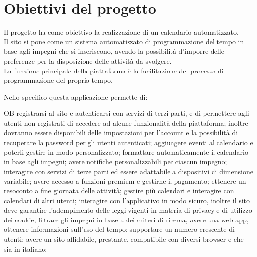 \section{Obiettivi del progetto}
\label{secD1:ObiettiviDelProgetto}

Il progetto ha come obiettivo la realizzazione di un calendario automatizzato.\\
Il sito si pone come un sistema automatizzato di programmazione del tempo in base agli impegni che si inseriscono, avendo la possibilità d'imporre delle preferenze per la disposizione delle attività da svolgere.\\
La funzione principale della piattaforma è la facilitazione del processo di programmazione del proprio tempo.

\vspace{0.5cm}

Nello specifico questa applicazione permette di:
\begin{listaPersonale}{OB}
       registrarsi al sito e autenticarsi con servizi di terzi parti, e di permettere agli utenti non registrati di accedere ad alcune funzionalità della piattaforma; inoltre dovranno essere disponibili delle impostazioni per l'account e la possibilità di recuperare la password per gli utenti autenticati;
       aggiungere eventi al calendario e poterli gestire in modo personalizzato;
       formattare automaticamente il calendario in base agli impegni;
       avere notifiche personalizzabili per ciascun impegno;
       interagire con servizi di terze parti ed essere adattabile a dispositivi di dimensione variabile;
       avere accesso a funzioni premium e gestirne il pagamento;
       ottenere un resoconto a fine giornata delle attività;
       gestire più calendari e interagire con calendari di altri utenti;
       interagire con l'applicativo in modo sicuro, inoltre il sito deve garantire l'adempimento delle leggi vigenti in materia di privacy e di utilizzo dei cookie;
       filtrare gli impegni in base a dei criteri di ricerca;
       avere una web app;
       ottenere informazioni sull'uso del tempo;
       supportare un numero crescente di utenti;
       avere un sito affidabile, prestante, compatibile con diversi browser e che sia in italiano;
\end{listaPersonale}

